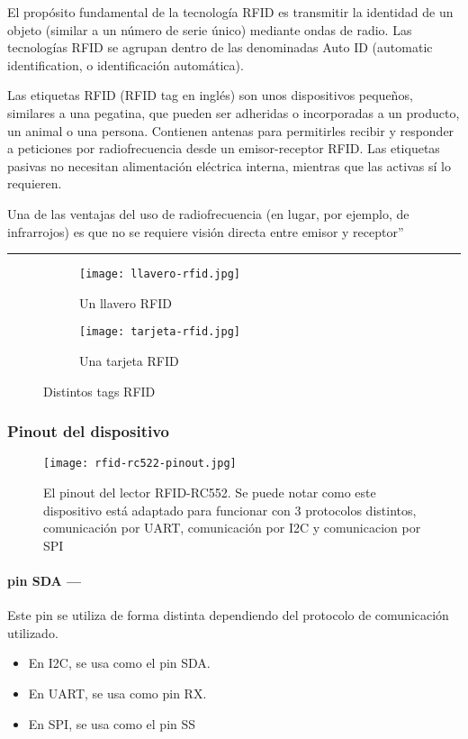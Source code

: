 \documentclass[../informe_krapp.tex]{subfiles}
\begin{document}
El propósito fundamental de la tecnología RFID es transmitir la identidad de
un objeto (similar a un número de serie único) mediante ondas de radio. Las tecnologías
RFID se agrupan dentro de las denominadas Auto ID (automatic identification,
o identificación automática).

Las etiquetas RFID (RFID tag en inglés) son unos dispositivos pequeños, similares
a una pegatina, que pueden ser adheridas o incorporadas a un producto, un animal
o una persona. Contienen antenas para permitirles recibir y responder a peticiones
por radiofrecuencia desde un emisor-receptor RFID. Las etiquetas pasivas no necesitan
alimentación eléctrica interna, mientras que las activas sí lo requieren.

Una de las ventajas del uso de radiofrecuencia (en lugar, por ejemplo, de infrarrojos)
es que no se requiere visión directa entre emisor y receptor''

\begin{center}
	\rule{0.8\textwidth}{0.3pt}
\end{center}

\begin{figure}[H]
	\centering
	\begin{subfigure}{0.4\textwidth}
		\texttt{[image: llavero-rfid.jpg]}
		\caption{Un llavero RFID}
	\end{subfigure}
	\begin{subfigure}{0.4\textwidth}
		\texttt{[image: tarjeta-rfid.jpg]}
		\caption{Una tarjeta RFID}
	\end{subfigure}
	\caption{Distintos tags RFID}
\end{figure}

\clearpage
\subsubsection{Pinout del dispositivo}

\begin{wrapfigure}{r}{0in}
	\centering
	\texttt{[image: rfid-rc522-pinout.jpg]}
	\caption{El pinout del lector RFID-RC552.
		Se puede notar como este dispositivo está adaptado para funcionar con 3 protocolos
		distintos, comunicación por UART, comunicación por I2C y comunicacion por SPI}
\end{wrapfigure}


\paragraph{pin SDA ---}
Este pin se utiliza de forma distinta dependiendo del protocolo
de comunicación utilizado.
\begin{itemize}
	\item En I2C, se usa como el pin SDA.
	\item En UART, se usa como pin RX.
	\item En SPI, se usa como el pin SS
\end{itemize}
\end{document}
